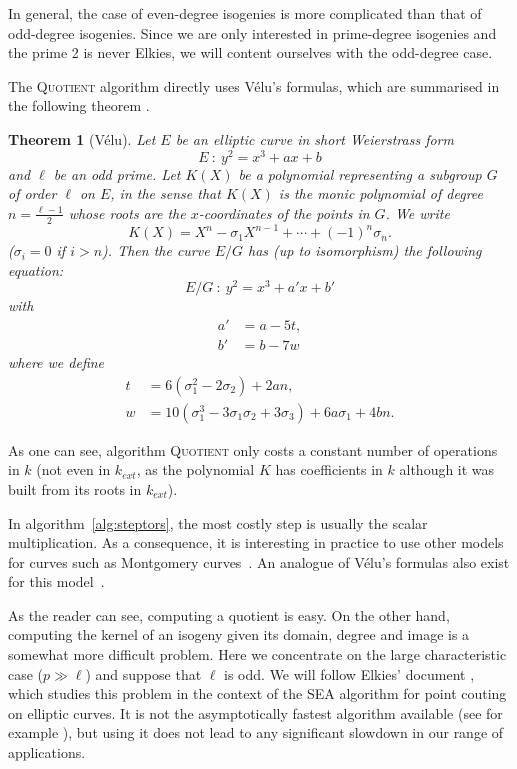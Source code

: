 \documentclass{article}
\newcommand{\algstyle}[1]{\textsc{#1}}
\renewcommand{\v}{\vspace{5mm}}
\newtheorem{theorem}{Theorem}[section]
\theoremstyle{definition}
\begin{document}
In general, the case of even-degree isogenies is
more complicated than that of odd-degree isogenies. Since we are only
interested in prime-degree isogenies and the prime 2 is never Elkies, we
will content ourselves with the odd-degree case.

The \algstyle{Quotient} algorithm directly uses Vélu's formulas, which are
summarised in the following theorem \cite{}.
\begin{theorem}[Vélu]
Let $E$ be an elliptic curve in short Weierstrass form
\[
E\ :\ y^2 = x^3 + a x + b
\]
and $\ell$ be an odd prime. Let $K(X)$ be a polynomial representing a subgroup $G$
of order $\ell$ on $E$, in the sense that $K(X)$ is the monic polynomial of degree
$n = \frac{\ell - 1}{2}$ whose roots are the $x$-coordinates of the points in $G$.
We write
\[
K(X) = X^n - \sigma_1 X^{n-1} + \cdots + (-1)^n \sigma_n.
\]
($\sigma_i = 0$ if $i>n$).
Then the curve $E/G$ has (up to isomorphism) the following equation:
\[
E/G\ :\ y^2 = x^3 + a' x + b'
\]
with
\[
\begin{aligned}
a' &= a - 5t,\\
b' &= b - 7w
\end{aligned}
\]
where we define
\[
\begin{aligned}
t &= 6 (\sigma_1^2 - 2\sigma_2) + 2 a n,\\
w &= 10 (\sigma_1^3 - 3 \sigma_1\sigma_2 + 3\sigma_3) + 6 a\sigma_1 + 4bn.
\end{aligned}
\]


\end{theorem}

As one can see, algorithm \algstyle{Quotient} only costs a constant number
of operations in $k$ (not even in $k_{ext}$, as the polynomial $K$ has
coefficients in $k$ although it was built from its roots in $k_{ext}$).

In algorithm~\ref{alg:steptors}, the most costly step is usually the
scalar multiplication. As a consequence, it is interesting in practice
to use other models for curves such as Montgomery curves~\cite{}.
An analogue of Vélu's formulas also exist for this model~\cite{}.

\v

As the reader can see, computing a quotient is easy. On the other hand,
computing the kernel of an isogeny given its domain, degree and image is a
somewhat more difficult problem. Here we concentrate on the large
characteristic case ($p\gg\ell$) and suppose that $\ell$ is odd.
We will follow Elkies' document \cite{}, which studies
this problem in the context of the SEA algorithm for point couting on
elliptic curves. It is not the asymptotically fastest algorithm available
(see for example \cite{}),
but using it does not lead to any significant slowdown in our range of applications.
\end{document}
